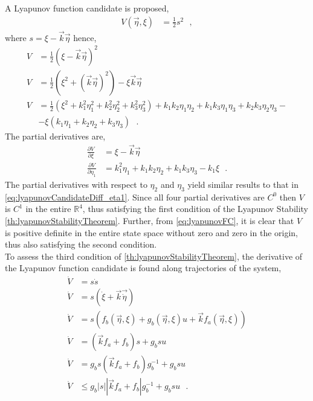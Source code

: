 A Lyapunov function candidate is proposed,
\begin{align}
  V(\vec{\eta}, \xi) &= \tfrac{1}{2}s^2 \ \ \ , \label{eq:lyapunovFunctionCandidate}
\end{align}
where $s = \xi - \vec{k} \vec{\eta}$ hence,
\begin{align}
V &= \tfrac{1}{2}(\xi - \vec{k} \vec{\eta})^2 \label{eq:lyapunovFC}\\
V &= \tfrac{1}{2}( \xi^2 + (\vec{k} \vec{\eta})^2 ) - \xi \vec{k} \vec{\eta} \\
V &= \tfrac{1}{2}( \xi^2 + k_1^2 \eta_1^2 + k_2^2 \eta_2^2 + k_3^2 \eta_3^2 ) + k_1 k_2 \eta_1 \eta_2 + k_1 k_3 \eta_1 \eta_3 + k_2 k_3 \eta_2 \eta_3 - \nonumber \\
  &- \xi ( k_1 \eta_1 + k_2 \eta_2 + k_3 \eta_3 )
\ \ \ . \label{eq:lyapunovFCExpanded}
\end{align}
The partial derivatives are,
\begin{align}
  \frac{\partial V}{\partial \xi}    &= \xi - \vec{k}\vec{\eta}
    \label{eq:lyapunovCandidateDiff_xi} \\
  \frac{\partial V}{\partial \eta_1} &= k_1^2 \eta_1 + k_1 k_2 \eta_2 + k_1 k_3 \eta_3 - k_1 \xi
    \label{eq:lyapunovCandidateDiff_eta1} 
    \ \ \ .
\end{align}
The partial derivatives with respect to $\eta_2$ and $\eta_3$ yield similar results to that in \autoref{eq:lyapunovCandidateDiff_eta1}. Since all four partial derivatives are $C^0$ then $V$ is $C^1$ in the entire $\mathbb{R} ^4$, thus satisfying the first condition of the Lyapunov Stability \autoref{th:lyapunovStabilityTheorem}. Further, from \autoref{eq:lyapunovFC}, it is clear that $V$ is positive definite in the entire state space without zero and zero in the origin, thus also satisfying the second condition.\\
To assess the third condition of \autoref{th:lyapunovStabilityTheorem}, the derivative of the Lyapunov function candidate is found along trajectories of the system,
\begin{align}
\dot{V} &= s\dot{s} \\
\dot{V} &= s ( \dot{\xi} + \vec{k}\vec{\dot{\eta}}  ) \\
\dot{V} &= s ( f_b(\vec{\eta},\xi) + g_b(\vec{\eta},\xi) u +\vec{k}f_a(\vec{\eta},\xi) )  \\
\dot{V} &= (\vec{k}f_a +  f_b) s + g_b s u \\
\dot{V} &= g_b s (\vec{k}f_a  +  f_b) g_b^{-1} + g_b s u   \\
\dot{V} &\leq g_b |s| \left|\vec{k}f_a  +  f_b \right| g_b^{-1} + g_b s u  \ \ \ .
\label{eq:lyapunov}
\end{align}
